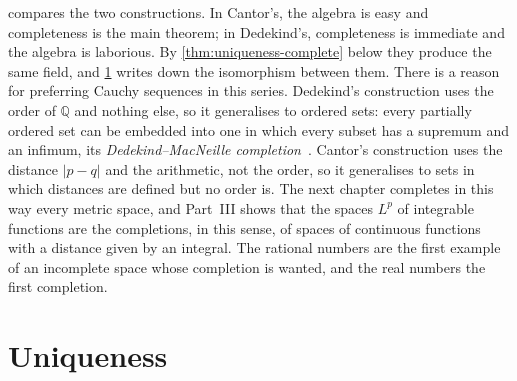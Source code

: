  compares the two constructions. In Cantor's, the algebra is easy and completeness is the main theorem; in Dedekind's, completeness is immediate and the algebra is laborious. By \cref{thm:uniqueness-complete} below they produce the same field, and \cref{sec:uniqueness} writes down the isomorphism between them. There is a reason for preferring Cauchy sequences in this series. Dedekind's construction uses the order of $\mathbb Q$ and nothing else, so it generalises to ordered sets: every partially ordered set can be embedded into one in which every subset has a supremum and an infimum, its \emph{Dedekind--MacNeille completion}~\cite{daveypriestley2002}. Cantor's construction uses the distance $|p-q|$ and the arithmetic, not the order, so it generalises to sets in which distances are defined but no order is. The next chapter completes in this way every metric space, and Part~III shows that the spaces $L^p$ of integrable functions are the completions, in this sense, of spaces of continuous functions with a distance given by an integral. The rational numbers are the first example of an incomplete space whose completion is wanted, and the real numbers the first completion.

\begin{table}
\end{table}

\section{Uniqueness}
\label{sec:uniqueness}

